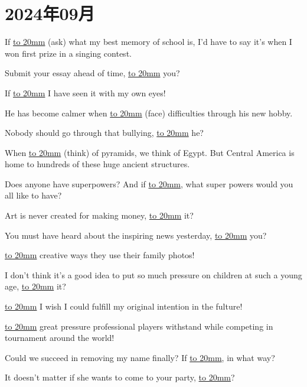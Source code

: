 \setcounter{section}{1}
\section{2024年09月}

\item {
    If \underline{\hbox to 20mm{}} (ask) what my best memory of school is, I'd have to say it's when I won first prize in a singing contest. 
} 
\item {
    Submit your essay ahead of time, \underline{\hbox to 20mm{}} you?
} 
\item {
    If \underline{\hbox to 20mm{}} I have seen it with my own eyes!
} 
\item {
    He has become calmer when \underline{\hbox to 20mm{}} (face) difficulties through his new hobby.
} 
\item {
    Nobody should go through that bullying, \underline{\hbox to 20mm{}} he?
} 
\item {
    When \underline{\hbox to 20mm{}} (think) of pyramids, we think of Egypt. But Central America is home to hundreds of these huge ancient structures.
} 
\item {
    Does anyone have superpowers? And if \underline{\hbox to 20mm{}}, what super powers would you all like to have?
} 
\item {
    Art is never created for making money, \underline{\hbox to 20mm{}} it?
} 
\item {
    You must have heard about the inspiring news yesterday,  \underline{\hbox to 20mm{}} you?
} 
\item {
    \underline{\hbox to 20mm{}} creative ways they use their family photos!
} 
\item {
    I don't think it's a good idea to put so much pressure on children at such a young age, \underline{\hbox to 20mm{}} it?
} 
\item {
    \underline{\hbox to 20mm{}} I wish I could fulfill my original intention in the fulture!
} 
\item {
    \underline{\hbox to 20mm{}} great pressure professional players withstand while competing in tournament around the world!
} 
\item {
    Could we succeed in removing my name finally? If \underline{\hbox to 20mm{}}, in what way?
} 
\item {
    It doesn't matter if she wants to come to your party, \underline{\hbox to 20mm{}}?
} 

